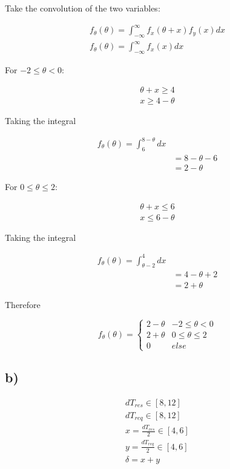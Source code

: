 \documentclass[12pt]{article}
\begin{document}
Take the convolution of the two variables:

\begin{align*}
    f_\theta(\theta) = \int^{\infty}_{-\infty} f_x(\theta + x)f_y(x)dx \\
    f_\theta(\theta) = \int^{\infty}_{-\infty} f_x(x)dx
\end{align*}

For $-2 \le \theta < 0$:

\begin{align*}
\theta + x \ge 4 \\
x \ge 4 - \theta
\end{align*}

Taking the integral

\begin{align*}
    f_\theta(\theta) = \int^{8 - \theta}_{6} dx \\
    &= 8 - \theta - 6 \\
    &= 2 - \theta
\end{align*}

For $0 \le \theta \le 2$:

\begin{align*}
\theta + x \le 6 \\
x \le 6 - \theta
\end{align*}

Taking the integral

\begin{align*}
    f_\theta(\theta) = \int^{4}_{\theta - 2} dx \\
    &= 4 - \theta + 2 \\
    &= 2 + \theta
\end{align*}

Therefore

\[ f_\theta(\theta) =  \begin{cases} 
      2 - \theta & -2 \le \theta < 0 \\
      2 + \theta & 0 \le \theta \le 2 \\
      0 & else
   \end{cases}
\]

\subsection*{b)}

\begin{align*}
    dT_{res} \in \left[8, 12 \right] \\
    dT_{req} \in \left[8, 12 \right] \\    
    x = \frac{dT_{res}}{2} \in \left[4, 6 \right] \\
    y = \frac{dT_{req}}{2} \in \left[4, 6 \right]\\
    \delta = x + y
\end{align*}
\end{document}

